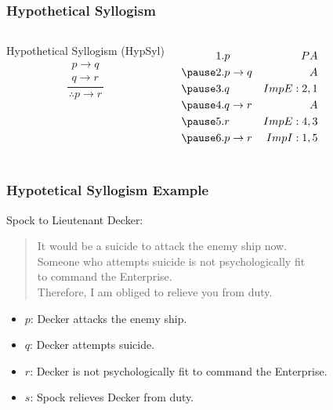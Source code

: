 \documentclass[dvipsnames]{beamer}
\begin{document}
\begin{frame}
  \frametitle{Hypothetical Syllogism}

  \begin{columns}
    \begin{block}{Hypothetical Syllogism (HypSyl)}
      \[
      \frac
        {
          \begin{array}{c}
            p \rightarrow q\\
            q \rightarrow r
          \end{array}}
        {
          \therefore p \rightarrow r
        }
      \]
    \end{block}

    \pause
    \begin{eqnarray*}
      1. & p               & PA\\
      \pause
      2. & p \rightarrow q & A\\
      \pause
      3. & q               & ImpE:2,1\\
      \pause
      4. & q \rightarrow r & A\\
      \pause
      5. & r               & ImpE:4,3\\
      \pause
      6. & p \rightarrow r & ImpI:1,5\\
    \end{eqnarray*}
  \end{columns}
\end{frame}

\begin{frame}
  \frametitle{Hypotetical Syllogism Example}

  Spock to Lieutenant Decker:
  \begin{quote}
    It would be a suicide to attack the enemy ship now.\\
    Someone who attempts suicide is not psychologically fit\\
    to command the Enterprise.\\
    Therefore, I am obliged to relieve you from duty.
  \end{quote}

  \pause
  \begin{itemize}
    \item $p$: Decker attacks the enemy ship.
    \item $q$: Decker attempts suicide.
    \item $r$: Decker is not psychologically fit to command the Enterprise.
    \item $s$: Spock relieves Decker from duty.
  \end{itemize}
\end{frame}
\end{document}
